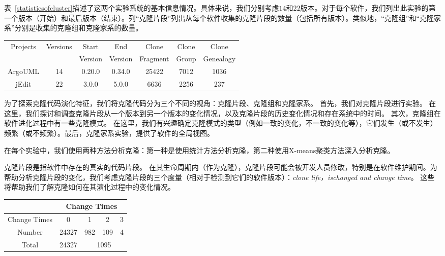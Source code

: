 表~\ref{statisticsofcluster}描述了这两个实验系统的基本信息情况。具体来说，我们分别考虑$ 14 $和$ 22 $版本。对于每个软件，我们列出此实验的第一个版本（开始）和最后版本（结束）。列“克隆片段”列出从每个软件收集的克隆片段的数量（包括所有版本）。类似地，“克隆组”和“克隆家系”分别是收集的克隆组和克隆家系的数量。
\begin{table}[htbp]
\vspace{0.5em}\centering \wuhao
\begin{tabular}{ccccccc}
\toprule [1.5pt ]
\multirow{2}{*}{Projects}&\multirow{2}{*}{Versions}&Start&End&Clone&Clone&Clone\\ 
&&Version&Version&Fragment&Group&Genealogy\\
\midrule[1pt]
ArgoUML&14&0.20.0&0.34.0&25422&7012&1036\\ 
jEdit&22&3.0.0&5.0.0&6636&2256	&237\\ 
\bottomrule [1.5pt]
\end{tabular}
\end{table}

为了探索克隆代码演化特征，我们将克隆代码分为三个不同的视角：克隆片段、克隆组和克隆家系。 首先，我们对克隆片段进行实验。 在这里，我们探讨和调查克隆片段从一个版本到另一个版本的变化情况，以及克隆片段的历史变化情况和存在系统中的时间。 其次，克隆组在软件进化过程中有一些克隆模式。 在这里，我们有兴趣确定克隆模式的类型（例如一致的变化，不一致的变化等），它们发生（或不发生）频繁（或不频繁）。最后，克隆家系实验，提供了软件的全局视图。

在每个实验中，我们使用两种方法分析克隆：第一种是使用统计方法分析克隆，第二种使用X-means聚类方法深入分析克隆。


克隆片段是指软件中存在的真实的代码片段。 在其生命周期内（作为克隆），克隆片段可能会被开发人员修改，特别是在软件维护期间。为帮助分析克隆片段的变化，我们考虑克隆片段的三个度量（相对于检测到它们的软件版本）：{\em clone life，ischanged and change time}。 这些将帮助我们了解克隆如何在其演化过程中的变化情况。

\begin{table}[htbp]
\vspace{0.5em}\centering\wuhao
\begin{tabular}{ccccc}
\toprule[1.5pt]
 & \multicolumn{4}{c}{Change Times}\\
\midrule[1pt]
Change Times&0&1&2&3\\ 
Number&24327&982&109&4\\ 
Total&24327&\multicolumn{3}{c}{1095} \\
\bottomrule[1.5pt]
\end{tabular}
\end{table}

